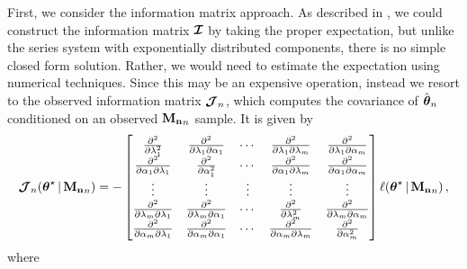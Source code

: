 \documentclass[
    11pt,
    extrafontsizes,
    article,
    oldfontcommands,
    final,
    oneside,
    openany,
    hidelinks]{memoir}
\begin{document}
First, we consider the information matrix approach. As described in \Cref{}, we could construct the information matrix $\operatorname{\boldsymbol{\mathcal{I}}}$ by taking the proper expectation, but unlike the series system with exponentially distributed components, there is no simple closed form solution. Rather, we would need to estimate the expectation using numerical techniques. Since this may be an expensive operation, instead we resort to the observed information matrix $\operatorname{\boldsymbol{\mathcal{J}}}_n$, which computes the covariance of $\hat{\boldsymbol{\mathbf{\theta}}}_n$ conditioned on an observed $\boldsymbol{\mathbf{M_n}}_n$ sample. It is given by
\begin{equation}
\label{info_matrix_lom}
    \operatorname{\boldsymbol{\mathcal{J}}}_n({\boldsymbol{\mathbf{\theta}}}^{\star} {\,|\,} \boldsymbol{\mathbf{M_n}}_n) = -
    \begin{bmatrix}
        \frac{\partial^2} {\partial \lambda_1^2} &
        \frac{\partial^2} {\partial \lambda_1 \partial \alpha_1 } &
        \cdots &
        \frac{\partial^2} {\partial \lambda_1 \partial \lambda_m } &
        \frac{\partial^2} {\partial \lambda_1 \partial \alpha_m }\\
        \frac{\partial^2} {\partial \alpha_1 \partial \lambda_1 } &
        \frac{\partial^2} {\partial \alpha_1^2} &
        \cdots &
        \frac{\partial^2} {\partial \alpha_1 \partial \lambda_m } &
        \frac{\partial^2} {\partial \alpha_1 \partial \alpha_m }\\
        \vdots &    \vdots &    \vdots &    \vdots &    \vdots\\
        \frac{\partial^2} {\partial \lambda_m \partial \lambda_1 } &
        \frac{\partial^2} {\partial \lambda_m \partial \alpha_1 } &
        \cdots &
        \frac{\partial^2} {\partial \lambda_m^2} &
        \frac{\partial^2} {\partial \lambda_m \partial \alpha_m}\\
        \frac{\partial^2} {\partial \alpha_m \partial \lambda_1 } &
        \frac{\partial^2} {\partial \alpha_m \partial \alpha_1 } &
        \cdots &
        \frac{\partial^2} {\partial \alpha_m \partial \lambda_m} &
        \frac{\partial^2} {\partial \alpha_m^2}
    \end{bmatrix} \ell({\boldsymbol{\mathbf{\theta}}}^{\star} {\,|\,} \boldsymbol{\mathbf{M_n}}_n)\,,
\end{equation}
where
\end{document}
